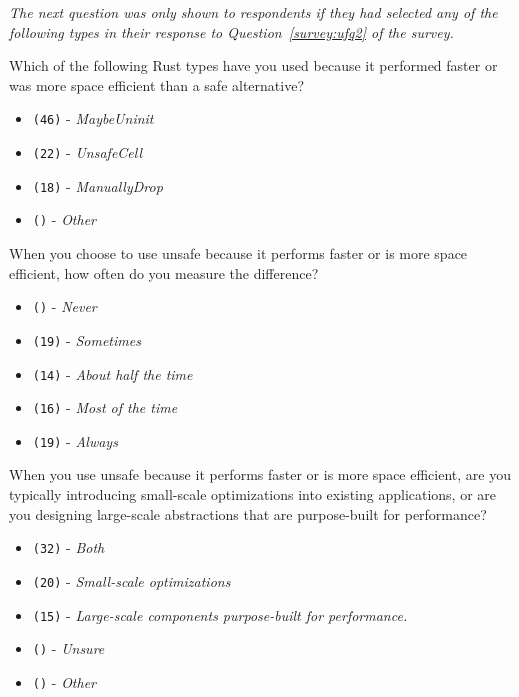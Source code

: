 \noindent \textit{The next question was only shown to respondents if they had selected any of the following types in their response to Question~\ref{survey:ufq2} of the survey.}
\begin{protocol}
\setcounter{protocoli}{1}
\item \label{survey:wupq2}  Which of the following Rust types have you used because it performed faster or was more space efficient than a safe alternative?
\begin{itemize}
\item \texttt{(46)} - \textit{MaybeUninit}
\item \texttt{(22)} - \textit{UnsafeCell}
\item \texttt{(18)} - \textit{ManuallyDrop}
\item \texttt{()} - \textit{Other}
\end{itemize}

\item \label{survey:wupq3}  When you choose to use unsafe because it performs faster or is more space efficient, how often do you measure the difference?
\begin{itemize}
\item \texttt{()} - \textit{Never}
\item \texttt{(19)} - \textit{Sometimes}
\item \texttt{(14)} - \textit{About half the time}
\item \texttt{(16)} - \textit{Most of the time}
\item \texttt{(19)} - \textit{Always}
\end{itemize}
\item \label{survey:wupq4}  When you use unsafe because it performs faster or is more space efficient, are you typically introducing small-scale optimizations into existing applications, or are you designing large-scale abstractions that are purpose-built for performance?
\begin{itemize}
\item \texttt{(32)} - \textit{Both}
\item \texttt{(20)} - \textit{Small-scale optimizations}
\item \texttt{(15)} - \textit{Large-scale components purpose-built for performance.}
\item \texttt{()} - \textit{Unsure}
\item \texttt{()} - \textit{Other}
\end{itemize}
\end{protocol}

